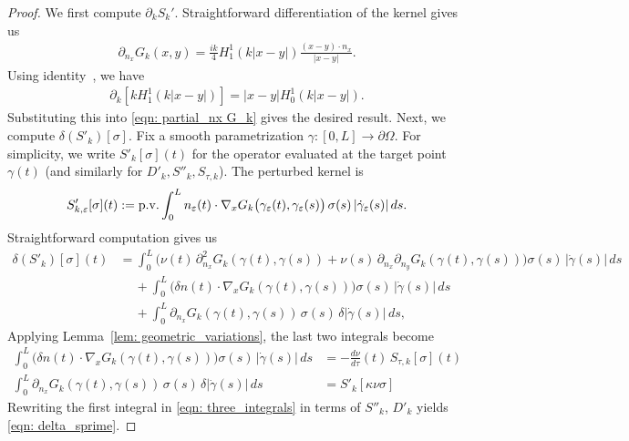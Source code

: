 \documentclass{amsart}
\theoremstyle{plain}
\begin{document}
\begin{proof}
We first compute $\partial_kS_k'$.
Straightforward differentiation of the kernel gives us
  \begin{align}\label{eqn: partial_nx G_k}
    \partial_{n_x}G_k(x,y)
    =\frac{ik}{4}H_1^1(k|x-y|)\frac{(x-y)\cdot n_x}{|x-y|}.
  \end{align}
Using identity~\cite[Eq.~10.6.6]{dlmf}, we have
  \begin{align}
    \partial_k \left[kH_1^1(k|x-y|)\right]=|x-y|H_0^1(k|x-y|).
  \end{align}
Substituting this into \eqref{eqn: partial_nx G_k} gives the desired result.
Next, we compute $\delta\left(S'_k\right)[\sigma]$.
Fix a smooth parametrization $\gamma:[0,L]\to\partial \Omega$. 
For simplicity, we write $S'_k[\sigma](t)$ for the operator evaluated at the target point $\gamma(t)$ (and similarly for $D'_k,S''_k,S_{\tau,k}$). 
The perturbed kernel is
  \begin{align}
    S'_{k,\varepsilon}[\sigma](t)
    := {\rm p.v.}\int_0^L n_\varepsilon(t)\cdot\nabla_x G_k\big(\gamma_\varepsilon(t),\gamma_\varepsilon(s)\big)\,\sigma(s)\,|\dot\gamma_\varepsilon(s)|\,ds.
  \end{align}
Straightforward computation gives us
\begin{equation}
\label{eqn: three_integrals}
  \begin{aligned}
    \delta\left(S'_k\right)[\sigma](t)
    &= \int_0^L \Big(\nu(t)\,\partial_{n_x}^2G_k(\gamma(t),\gamma(s)) + \nu(s)\,\partial_{n_x}\partial_{n_y}G_k(\gamma(t),\gamma(s))\Big)\sigma(s)\,|\dot\gamma(s)|\,ds\\
    &\quad\ +\int_0^L \big(\delta n(t)\cdot\nabla_x G_k(\gamma(t),\gamma(s))\big)\sigma(s)\,|\dot\gamma(s)|\,ds\\
    &\quad\ +\int_0^L \partial_{n_x}G_k(\gamma(t),\gamma(s))\,\sigma(s)\,\delta|\dot\gamma(s)|\,ds,
  \end{aligned}
  \end{equation}
Applying Lemma~\ref{lem: geometric_variations}, the last two integrals become
\begin{equation}
  \begin{aligned}
    \int_0^L \big(\delta n(t)\cdot\nabla_x G_k(\gamma(t),\gamma(s))\big)\sigma(s)\,|\dot\gamma(s)|\,ds
    &= -\frac{d\nu}{d\tau}(t)\,S_{\tau,k}[\sigma](t)\\
    \int_0^L \partial_{n_x}G_k(\gamma(t),\gamma(s))\,\sigma(s)\,\delta|\dot\gamma(s)|\,ds&=S'_k[\kappa \nu\sigma]
  \end{aligned}
  \end{equation}
Rewriting the first integral in \eqref{eqn: three_integrals} in terms of $S''_k$, $D'_k$ yields \eqref{eqn: delta_sprime}.
\end{proof}
\end{document}
